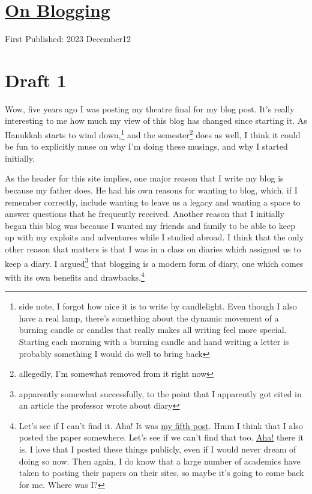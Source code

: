 \documentclass[12pt]{article}[titlepage]
\newcommand{\1}{\={a}}
\newcommand{\2}{\={e}}
\newcommand{\3}{\={\i}}
\newcommand{\4}{\=o}
\newcommand{\5}{\=u}
\newcommand{\6}{\={A}}
\renewcommand{\,}{\textsuperscript{,}}
\begin{document}
\doublespacing
\section{\href{blogging.html}{On Blogging}}
First Published: 2023 December12

\section{Draft 1}
Wow, five years ago I was posting my theatre final for my blog post.
It's really interesting to me how much my view of this blog has changed since starting it.
As Hanukkah starts to wind down,\footnote{side note, I forgot how nice it is to write by candlelight. Even though I also have a real lamp, there's something about the dynamic movement of a burning candle or candles that really makes all writing feel more special. Starting each morning with a burning candle and hand writing a letter is probably something I would do well to bring back} and the semester\footnote{allegedly, I'm somewhat removed from it right now} does as well, I think it could be fun to explicitly muse on why I'm doing these musings, and why I started initially.

As the header for this site implies, one major reason that I write my blog is because my father does.
He had his own reasons for wanting to blog, which, if I remember correctly, include wanting to leave us a legacy and wanting a space to answer questions that he frequently received.
Another reason that I initially began this blog was because I wanted my friends and family to be able to keep up with my exploits and adventures while I studied abroad.
I think that the only other reason that matters is that I was in a class on diaries which assigned us to keep a diary.
I argued\footnote{apparently somewhat successfully, to the point that I apparently got cited in an article the professor wrote about diary} that blogging is a modern form of diary, one which comes with its own benefits and drawbacks.\footnote{Let's see if I can't find it. Aha! It was \href{analog-vs-digital.html}{my fifth post}. Hmm I think that I also posted the paper somewhere. Let's see if we can't find that too. \href{digital-diaries.html}{Aha!} there it is. I love that I posted these things publicly, even if I would never dream of doing so now. Then again, I do know that a large number of academics have taken to posting their papers on their sites, so maybe it's going to come back for me. Where was I?}
\end{document}
